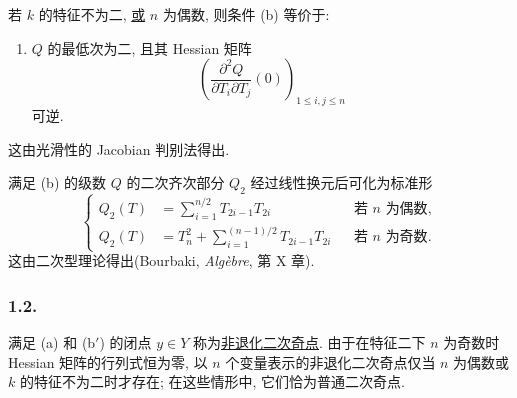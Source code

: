 若 $k$ 的特征不为二, \underline{或} $n$ 为偶数, 则条件 (b) 等价于:
\begin{enumerate}
\item[(b$'$)] $Q$ 的最低次为二, 且其 Hessian 矩阵
\[
\left(
  \frac{\partial^2Q}{\partial T_i\partial T_j}(0)
\right)_{1\leq i,j\leq n}
\]
可逆.
\end{enumerate}
这由光滑性的 Jacobian 判别法得出.

满足 (b) 的级数 $Q$ 的二次齐次部分 $Q_2$ 经过线性换元后可化为标准形
\begin{equation}\tag{1.1.1}
\left\{
\begin{aligned}
Q_2(T)&=\sum_{i=1}^{n/2}T_{2i-1}T_{2i}
  &&\text{若 $n$ 为偶数},\\[1ex]
Q_2(T)&=T_n^2+\sum_{i=1}^{(n-1)/2}T_{2i-1}T_{2i}
  &&\text{若 $n$ 为奇数}.
\end{aligned}
\right.
\end{equation}
这由二次型理论得出(Bourbaki, \emph{Alg\`ebre}, 第 X 章).

\subsubsection*{1.2.}
满足 (a) 和 (b$'$) 的闭点 $y\in Y$ 称为\underline{非退化二次奇点}. 由于在特征二下 $n$ 为奇数时 Hessian 矩阵的行列式恒为零, 以 $n$ 个变量表示的非退化二次奇点仅当 $n$ 为偶数或 $k$ 的特征不为二时才存在; 在这些情形中, 它们恰为普通二次奇点.